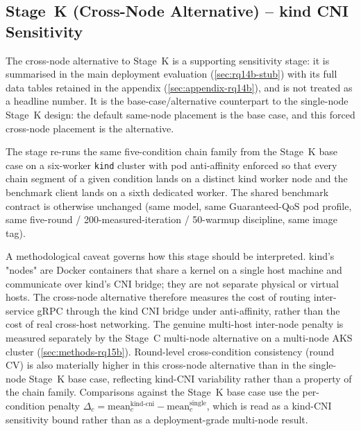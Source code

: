 \subsection{Stage~K (Cross-Node Alternative) -- kind CNI Sensitivity}
\label{sec:methods-rq14b}

The cross-node alternative to Stage~K is a supporting sensitivity stage: it is
summarised in the main deployment evaluation (\cref{sec:rq14b-stub}) with its full data
tables retained in the appendix (\cref{sec:appendix-rq14b}), and is not treated as a
headline number. It is the base-case/alternative
counterpart to the single-node Stage~K design: the default same-node placement is the base
case, and this forced cross-node placement is the alternative.

The stage re-runs the same five-condition chain family from the Stage~K base case on a six-worker
\texttt{kind} cluster with pod anti-affinity enforced so that every chain segment of a
given condition lands on a distinct kind worker node and the benchmark client lands on a
sixth dedicated worker. The shared benchmark contract is otherwise unchanged (same model,
same Guaranteed-QoS pod profile, same five-round / 200-measured-iteration / 50-warmup
discipline, same image tag).

A methodological caveat governs how this stage should be interpreted. kind's "nodes" are
Docker containers that share a kernel on a single host machine and communicate over kind's
CNI bridge; they are not separate physical or virtual hosts. The cross-node alternative
therefore measures the cost of routing inter-service gRPC through the kind CNI bridge under
anti-affinity, rather than the cost of real cross-host networking. The genuine multi-host
inter-node penalty is measured separately by the Stage~C multi-node alternative on a
multi-node AKS cluster
(\cref{sec:methods-rq15b}). Round-level cross-condition consistency (round CV) is also
materially higher in this cross-node alternative than in the single-node Stage~K base case,
reflecting kind-CNI variability rather than a property of the chain family. Comparisons
against the Stage~K base case use the per-condition penalty
$\Delta_c = \mathrm{mean}_c^{\mathrm{kind\text{-}cni}} - \mathrm{mean}_c^{\mathrm{single}}$,
which is read as a kind-CNI sensitivity bound rather than as a deployment-grade multi-node
result.

